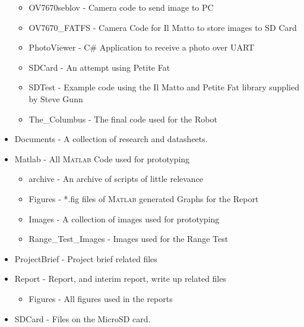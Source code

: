 \begin{itemize}
\begin{itemize}
\item OV7670seblov - Camera code to send image to PC
\item OV7670\_FATFS - Camera Code for Il Matto to store images to SD Card
\item PhotoViewer - C\# Application to receive a photo over UART
\item SDCard - An attempt using Petite Fat
\item SDTest - Example code using the Il Matto and Petite Fat library supplied by Steve Gunn
\item The\_Columbus - The final code used for the Robot
\end{itemize}
\item Documents - A collection of research and datasheets. 
\item Matlab - All \textsc{Matlab} Code used for prototyping
\begin{itemize}
\item archive - An archive of scripts of little relevance
\item Figures - *.fig files of \textsc{Matlab} generated Graphs for the Report
\item Images - A collection of images used for prototyping
\item Range\_Test\_Images - Images used for the Range Test
\end{itemize}
\item ProjectBrief - Project brief related files
\item Report - Report, and interim report, write up related files
\begin{itemize}
\item Figures - All figures used in the reports
\end{itemize}
\item SDCard - Files on the MicroSD card. 
\end{itemize} 
        
